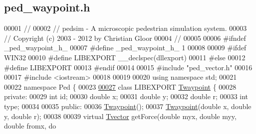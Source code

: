 \hypertarget{ped__waypoint_8h_source}{
\subsection{ped\_\-waypoint.h}
}

\begin{DoxyCode}
00001 \textcolor{comment}{//}
00002 \textcolor{comment}{// pedsim - A microscopic pedestrian simulation system. }
00003 \textcolor{comment}{// Copyright (c) 2003 - 2012 by Christian Gloor}
00004 \textcolor{comment}{//                              }
00005 
00006 \textcolor{preprocessor}{#ifndef \_ped\_waypoint\_h\_}
00007 \textcolor{preprocessor}{}\textcolor{preprocessor}{#define \_ped\_waypoint\_h\_ 1}
00008 \textcolor{preprocessor}{}
00009 \textcolor{preprocessor}{#ifdef WIN32}
00010 \textcolor{preprocessor}{}\textcolor{preprocessor}{#define LIBEXPORT \_\_declspec(dllexport)}
00011 \textcolor{preprocessor}{}\textcolor{preprocessor}{#else}
00012 \textcolor{preprocessor}{}\textcolor{preprocessor}{#define LIBEXPORT}
00013 \textcolor{preprocessor}{}\textcolor{preprocessor}{#endif}
00014 \textcolor{preprocessor}{}
00015 \textcolor{preprocessor}{#include "ped\_vector.h"}
00016 
00017 \textcolor{preprocessor}{#include <iostream>}
00018 
00019 
00020 \textcolor{keyword}{using namespace }std;
00021 
00022 \textcolor{keyword}{namespace }Ped \{
00023         
\hypertarget{ped__waypoint_8h_source_l00027}{}\hyperlink{classPed_1_1Twaypoint}{00027}         \textcolor{keyword}{class }LIBEXPORT \hyperlink{classPed_1_1Twaypoint}{Twaypoint} \{
00028         \textcolor{keyword}{private}:
00029                 \textcolor{keywordtype}{int} id;                                           
00030                 \textcolor{keywordtype}{double} x;                                         
00031                 \textcolor{keywordtype}{double} y;                                         
00032                 \textcolor{keywordtype}{double} r;                                         
00033                 \textcolor{keywordtype}{int} type;                                         
00034                 
00035         \textcolor{keyword}{public}:
00036                 \hyperlink{classPed_1_1Twaypoint}{Twaypoint}();
00037                 \hyperlink{classPed_1_1Twaypoint}{Twaypoint}(\textcolor{keywordtype}{double} x, \textcolor{keywordtype}{double} y, \textcolor{keywordtype}{double} r);
00038 
00039                 \textcolor{keyword}{virtual} \hyperlink{classPed_1_1Tvector}{Tvector} getForce(\textcolor{keywordtype}{double} myx, \textcolor{keywordtype}{double} myy, \textcolor{keywordtype}{double} fromx, \textcolor{keywordtype}{do
}
\end{DoxyCode}
